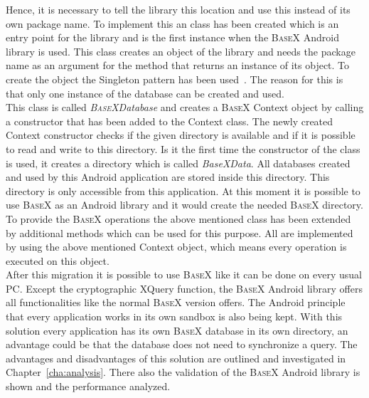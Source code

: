 Hence, it is necessary to tell the library this location and use this instead of its own package name.
To implement this an class has been created which is an entry point for the library and is the first instance when the \textsc{BaseX} Android library is used.
This class creates an object of the library and needs the package name as an argument for the method that returns an instance of its object.
To create the object the Singleton pattern has been used~\cite{gamma2010entwurfsmuster}.
The reason for this is that only one instance of the database can be created and used.\\
This class is called \textit{\textsc{BaseX}Database} and creates a \textsc{BaseX} Context object by calling a constructor that has been added to the Context class.
The newly created Context constructor checks if the given directory is available and if it is possible to read and write to this directory.
Is it the first time the constructor of the class is used, it creates a directory which is called \textit{BaseXData}.
All databases created and used by this Android application are stored inside this directory.
This directory is only accessible from this application.
At this moment it is possible to use \textsc{BaseX} as an Android library and it would create the needed \textsc{BaseX} directory.\\
To provide the \textsc{BaseX} operations the above mentioned class has been extended by additional methods which can be used for this purpose.
All are implemented by using the above mentioned Context object, which means every operation is executed on this object.\\
After this migration it is possible to use \textsc{BaseX} like it can be done on every usual PC.
Except the cryptographic XQuery function, the \textsc{BaseX} Android library offers all functionalities like the normal \textsc{BaseX} version offers.
The Android principle that every application works in its own sandbox is also being kept.
With this solution every application has its own \textsc{BaseX} database in its own directory, an advantage could be that the database does not need to synchronize a query.
The advantages and disadvantages of this solution are outlined and investigated in Chapter~\ref{cha:analysis}.
There also the validation of the \textsc{BaseX} Android library is shown and the performance analyzed.



